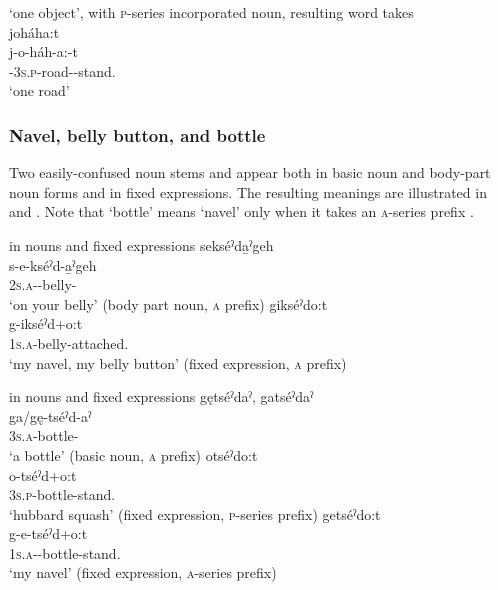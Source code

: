 \ea\label{ex:countvarex3}  ‘one object’, with \textsc{p}-series incorporated noun, resulting word takes \\
joháha:t\\
\gll j-o-háh-a:-t\\
 {\repetitive}-\textsc{3s.p}-road-{\joinerA}-stand.{\stative}\\
\glt `one road'
\z


\subsubsection{Navel, belly button, and bottle}
Two easily-confused noun stems  and  appear both in basic noun and body-part noun forms and in fixed expressions. The resulting meanings are illustrated in  and . Note that  ‘bottle’ means ‘navel’ only when it takes an \textsc{a}-series prefix .

\ea\label{ex:posownex11}  in nouns and fixed expressions
\ea sekséˀda̱ˀgeh\\
\gll s-e-kséˀd-a̱ˀgeh\\
 \textsc{2s.a}-{\joinerE}-belly-{\on} \\
\glt `on your belly' (body part noun, \textsc{a} prefix)
\ex gikséˀdo:t\\
\gll g-ikséˀd+o:t\\
 \textsc{1s.a}-belly-attached.{\stative} \\
\glt `my navel, my belly button' (fixed expression, \textsc{a} prefix)
\z
\z

\ea\label{ex:posownex12}  in nouns and fixed expressions
\ea gętséˀdaˀ, gatséˀdaˀ\\\label{ex:posownex12a}
\gll ga/gę-tséˀd-aˀ\\
 \textsc{3s.a}-bottle-{\nounstemformer}  \\
\glt `a bottle' (basic noun, \textsc{a} prefix)
\ex otséˀdo:t\\\label{ex:posownex12b}
\gll o-tséˀd+o:t\\
 \textsc{3s.p}-bottle-stand.{\stative}  \\
\glt `hubbard squash' (fixed expression, \textsc{p}-series prefix)
\ex getséˀdo:t\\\label{ex:posownex12c}
\gll g-e-tséˀd+o:t \\
 \textsc{1s.a}-{\joinerE}-bottle-stand.{\stative} \\
\glt `my navel' (fixed expression, \textsc{a}-series prefix)
\z
\z

